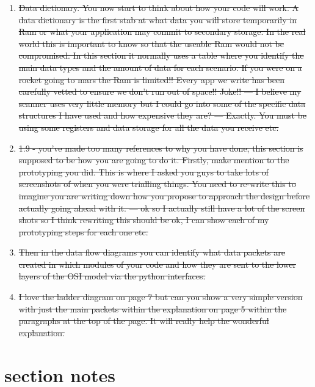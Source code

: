 \documentclass{article}
\begin{document}
\begin{enumerate}
  \item{\sout{Data dictionary. You now start to think about how your code will work. A data dictionary is the first stab at what data you will store temporarily in Ram or what your application may commit to secondary storage. In the real world this is important to know so that the useable Ram would not be  compromised.  In this section it normally uses a table where you identify the main data types and the amount of data for each scenario. If you were on a rocket going to mars the Ram is limited!! Every app we write has been carefully vetted to ensure we don’t run out of space!! Joke!! --- I believe my scanner uses very little memory but I could go into some of the specific data structures I have used and how expensive they are? --- Exactly. You must be using some registers and data storage for all the data you receive etc.}}
  \item{\sout{1.9 - you’ve made too many references to why you have done, this section is supposed to be how you are going to do it. Firstly, make mention to the prototyping you did. This is where I asked you guys to take lots of screenshots of when you were trialling things. You need to re-write this to imagine you are writing down how you propose to approach the design before actually going ahead with it. --- ok so I actually still have a lot of the screen shots so I think rewriting this should be ok, I can show each of my prototyping steps for each one etc.}}
  \item{\sout{Then in the data flow diagrams you can identify what data packets are created in which modules of your code and how they are sent to the lower layers of the OSI model via the python interfaces.}}
  \item{\sout{I love the ladder diagram on page 7 but can you show a very simple version with just the main packets within the explanation on page 5 within the paragraphs at the top of the page. It will really help the wonderful explanation.}}

\end{enumerate}

\section{section notes}
\end{document}
